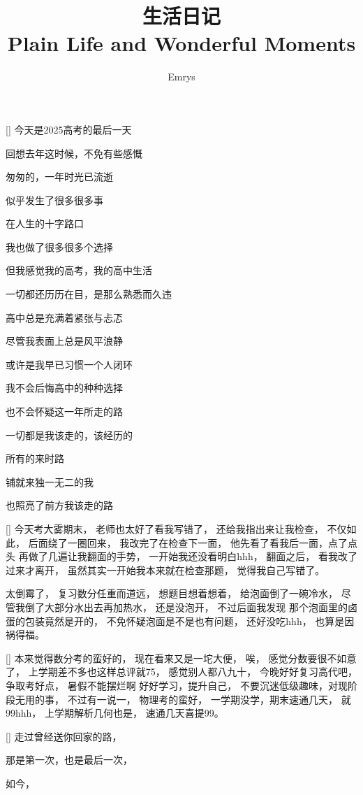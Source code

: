 \documentclass{diary}
\title{生活日记 \\{\small Plain Life and Wonderful Moments}}
\author{Emrys}
\begin{document}
\maketitle

\Address[江苏][南京]
[\sun]%
今天是2025高考的最后一天

回想去年这时候，不免有些感慨

匆匆的，一年时光已流逝

似乎发生了很多很多事

在人生的十字路口

我也做了很多很多个选择

但我感觉我的高考，我的高中生活

一切都还历历在目，是那么熟悉而久违

高中总是充满着紧张与忐忑

尽管我表面上总是风平浪静

或许是我早已习惯一个人闭环

我不会后悔高中的种种选择

也不会怀疑这一年所走的路

一切都是我该走的，该经历的

所有的来时路

铺就来独一无二的我

也照亮了前方我该走的路


[\winkSmile]%
今天考大雾期末，
老师也太好了看我写错了，
还给我指出来让我检查，
不仅如此，
后面绕了一圈回来，
我改完了在检查下一面，
他先看了看我后一面，点了点头
再做了几遍让我翻面的手势，
一开始我还没看明白hhh，
翻面之后，
看我改了过来才离开，
虽然其实一开始我本来就在检查那题，
觉得我自己写错了。\par
太倒霉了，
复习数分任重而道远，
想题目想着想着，
给泡面倒了一碗冷水，
尽管我倒了大部分水出去再加热水，
还是没泡开，
不过后面我发现
那个泡面里的卤蛋的包装竟然是开的，
不免怀疑泡面是不是也有问题，
还好没吃hhh，
也算是因祸得福。

[\confused]%
本来觉得数分考的蛮好的，
现在看来又是一坨大便，
唉，
感觉分数要很不如意了，
上学期差不多也这样总评就75，
感觉别人都八九十，
今晚好好复习高代吧，争取考好点，
暑假不能摆烂啊
好好学习，提升自己，
不要沉迷低级趣味，对现阶段无用的事，
不过有一说一，
物理考的蛮好，
一学期没学，期末速通几天，
就99hhh，
上学期解析几何也是，
速通几天喜提99。

\Address[湖南][衡阳]
[\clouds]%
走过曾经送你回家的路，

那是第一次，也是最后一次，

如今，
\end{document}

